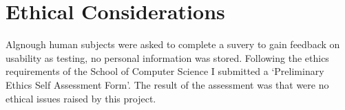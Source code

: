 \section{Ethical Considerations}
\label{Ethical_Considerations}
Algnough human subjects were asked to complete a suvery to gain feedback on  usability as testing, no personal information was stored. Following the  ethics requirements of the School of Computer Science I submitted a ‘Preliminary Ethics Self Assessment Form’. The result of the assessment was that were no  ethical issues raised by this project.



% 	
% 	
